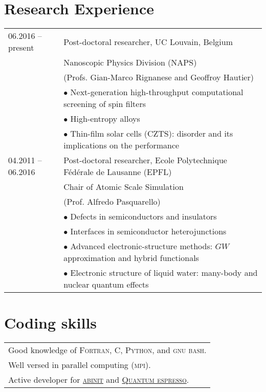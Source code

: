 \documentclass[a4paper, 11pt, DIV=15,headings=normal]{scrartcl}
\begin{document}
\section*{Research Experience}
\begin{tabular}{ll}
06.2016 -- present & Post-doctoral researcher, UC Louvain, Belgium \\
                   & Nanoscopic Physics Division (NAPS) \\ 
                   & (Profs. Gian-Marco Rignanese and Geoffroy Hautier)  \\
                   & $\bullet$ Next-generation high-throughput computational
                     screening of spin filters \\
                   & $\bullet$ High-entropy alloys \\
                   & $\bullet$ Thin-film solar cells (CZTS): disorder and its implications on the performance \\
                
04.2011 -- 06.2016 & Post-doctoral researcher, Ecole Polytechnique F\'{e}d\'{e}rale de Lausanne (EPFL) \\
                   & Chair of Atomic Scale Simulation  \\
                   & (Prof. Alfredo Pasquarello) \\
                   & $\bullet$ Defects in semiconductors and insulators \\
                   & $\bullet$ Interfaces in semiconductor heterojunctions  \\
                   & $\bullet$ Advanced electronic-structure methods: $GW$ approximation and hybrid functionals \\
                   & $\bullet$ Electronic structure of liquid water: many-body and nuclear quantum effects
\end{tabular}

\section*{Coding skills}
\begin{tabular}{l}
Good knowledge of \textsc{Fortran}, \textsc{C}, \textsc{Python}, and \textsc{gnu bash}.\\
Well versed in parallel computing (\textsc{mpi}). \\
Active developer for \href{http://www.abinit.org}{\textsc{abinit}} and 
\href{http://www.quantum-espresso.org}{\textsc{Quantum espresso}}. \\
\end{tabular}
\end{document}
